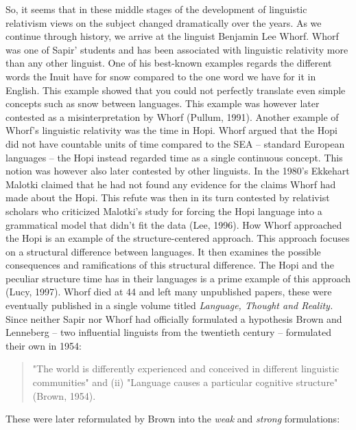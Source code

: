 So, it seems that in these middle stages of the development of linguistic relativism views on the subject changed dramatically over the years. As we continue through history, we arrive at the linguist Benjamin Lee Whorf. Whorf was one of Sapir’ students and has been associated with linguistic relativity more than any other linguist. One of his best-known examples regards the different words the Inuit have for snow compared to the one word we have for it in English. This example showed that you could not perfectly translate even simple concepts such as snow between languages. This example was however later contested as a misinterpretation by Whorf (Pullum, 1991). Another example of Whorf’s linguistic relativity was the time in Hopi. Whorf argued that the Hopi did not have countable units of time compared to the SEA – standard European languages – the Hopi instead regarded time as a single continuous concept. This notion was however also later contested by other linguists. In the 1980’s Ekkehart Malotki claimed that he had not found  any evidence for the claims Whorf had made about the Hopi. This refute was then in its turn contested by relativist scholars who criticized Malotki’s study for forcing the Hopi language into a grammatical model that didn’t fit the data (Lee, 1996). How Whorf approached the Hopi is an example of the structure-centered approach. This approach focuses on a structural difference between languages. It then examines the possible consequences and ramifications of this structural difference. The Hopi and the peculiar structure time has in their languages is a prime example of this approach (Lucy, 1997).  Whorf died at 44 and left many unpublished papers, these were eventually published in a single volume titled \textit{Language, Thought and Reality.} Since neither Sapir nor Whorf had officially formulated a hypothesis Brown and Lenneberg – two influential linguists from the twentieth century – formulated their own in 1954:  

\begin{quote}
\begin{singlespace}
"The world is differently experienced and conceived in different linguistic communities" and (ii) "Language causes a particular cognitive structure" (Brown, 1954).
\end{singlespace}
\end{quote}

These were later reformulated by Brown into the \textit{weak} and \textit{strong} formulations: 

